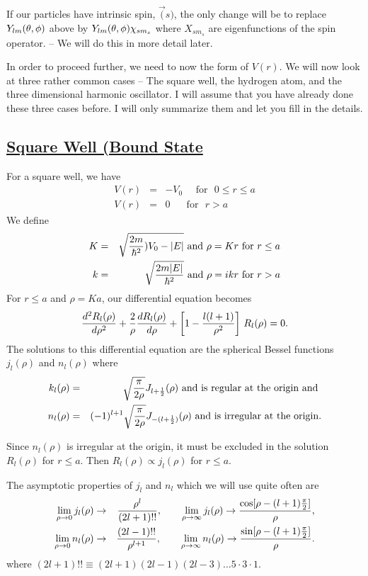 If our particles have intrinsic spin, $\vec(s)$, the only change will be to replace $Y_{lm}(\theta,\phi)$ above by $Y_{lm}(\theta,\phi) \chi_{sm_s}$ where $X_{sm_s}$ are eigenfunctions of the spin operator. -- We will do this in more detail later. 

In order to proceed further, we need to now the form of $V(r)$. We will now look at three rather common cases -- The square well, the hydrogen atom, and the three dimensional harmonic oscillator. I will assume that you 
have already done these three cases before. I will only summarize them and let you fill in the details.

\subsection{\underline{Square Well (Bound State}}
For a square well, we have 
\begin{eqnarray*}
V(r) &=& - V_0\mbox{~~~ for ~} 0\le r \le a \\
V(r) &=& 0 \mbox{~~~~ for ~} r > a
\end{eqnarray*}
We define 
\begin{eqnarray*}
K &=&  \sqrt{ {2m\over\hbar^2} )V_0 - |E| } \mbox{ and } \rho = Kr \mbox{ for } r\le a \\
k &=& \sqrt{{2m|E|\over\hbar^2}}\mbox{  and  } \rho = ikr \mbox{ for } r>a
\end{eqnarray*}
For $r\le a$ and $\rho = Ka$, our differential equation becomes 
\[ {d^2R_l(\rho)\over d\rho^2} + {2\over\rho} {dR_l(\rho)\over d\rho} + \left[ 1- {l(l+1)\over\rho^2}   \right]\, R_l(\rho) = 0. \]
The solutions to this differential equation are the spherical Bessel functions $j_l(\rho)$ and $n_l(\rho)$ where 
\begin{eqnarray*}
k_l(\rho) &=& \sqrt{\pi\over2\rho} J_{l+{1\over2}} (\rho) \mbox{ and is regular at the origin and }\\
n_l(\rho) &=& (-1)^{l+1} \sqrt{\pi\over2\rho} J_{-(l+{1\over2})}(\rho) \mbox{ and is irregular at the origin}.
\end{eqnarray*}

Since $n_l(\rho)$ is irregular at the origin, it must be excluded in the solution $R_l(\rho)$ for $r\le a$. Then $R_l(\rho) \propto j_l(\rho)$ for $r \le a$. 

The asymptotic properties of $j_l$ and $n_l$ which we will use quite often are
\begin{eqnarray*}
\lim_{\rho\rightarrow 0} j_l(\rho) &\rightarrow& {\rho^l\over (2l+1)!!}, ~~~~~~ \lim_{\rho\rightarrow\infty} j_l(\rho) \rightarrow {\cos[ \rho-(l+1){\pi\over2}]\over \rho}, \\
\lim_{\rho\rightarrow 0} n_l(\rho) &\rightarrow& {(2l-1)!!\over\rho^{l+1}}, ~~~~~~ \lim_{\rho\rightarrow\infty} n_l(\rho) \rightarrow {\sin[ \rho-(l+1){\pi\over2}]\over \rho}.
\end{eqnarray*}
where $(2l+1)!! \equiv (2l+1)(2l-1)(2l-3)\hdots5\cdot3\cdot1$.

